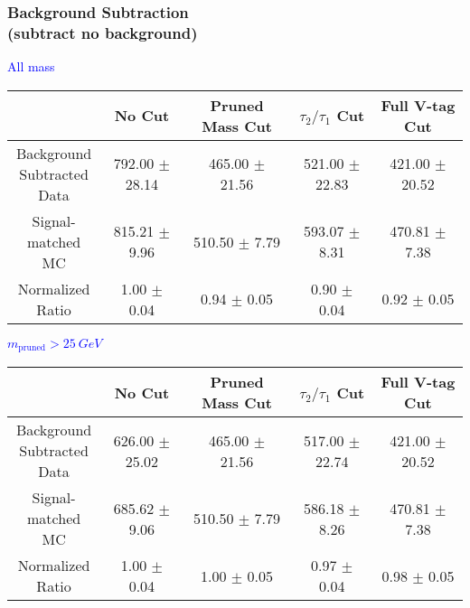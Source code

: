 \documentclass{beamer}
\begin{document}
\begin{frame}
  \frametitle{Background Subtraction \\ (subtract no background)}
  \begin{adjustwidth}{-1.5em}{-1.5em}
    \centering
    \vspace{6pt}
    \textcolor{blue}{All mass}
    \vspace{6pt}

    {\scriptsize
      \begin{tabular}{c | c | c | c | c}
        \hline
        & No Cut & Pruned Mass Cut & $\tau_2/\tau_1$ Cut & Full V-tag Cut \\
        \hline
        \makecell{Background \\ Subtracted \\ Data} & 792.00 $\pm$ 28.14 & 465.00 $\pm$ 21.56 & 521.00 $\pm$ 22.83 & 421.00 $\pm$ 20.52 \\
        \makecell{Signal-\\ matched MC} & 815.21 $\pm$ 9.96 & 510.50 $\pm$ 7.79 & 593.07 $\pm$ 8.31 & 470.81 $\pm$ 7.38 \\
        \hline
        \makecell{Normalized \\ Ratio} & 1.00 $\pm$ 0.04 & 0.94 $\pm$ 0.05 & 0.90 $\pm$ 0.04 & 0.92 $\pm$ 0.05 \\
        \hline
      \end{tabular}
    }

    \vspace{6pt}
    \textcolor{blue}{$m_\text{pruned} > \SI{25}{GeV}$}
    \vspace{6pt}

    {\scriptsize
      \begin{tabular}{c | c | c | c | c}
        \hline
        & No Cut & Pruned Mass Cut & $\tau_2/\tau_1$ Cut & Full V-tag Cut \\
        \hline
        \makecell{Background \\ Subtracted \\ Data} & 626.00 $\pm$ 25.02 & 465.00 $\pm$ 21.56 & 517.00 $\pm$ 22.74 & 421.00 $\pm$ 20.52 \\
        \makecell{Signal-\\ matched MC} & 685.62 $\pm$ 9.06 & 510.50 $\pm$ 7.79 & 586.18 $\pm$ 8.26 & 470.81 $\pm$ 7.38 \\
        \hline
        \makecell{Normalized \\ Ratio} & 1.00 $\pm$ 0.04 & 1.00 $\pm$ 0.05 & 0.97 $\pm$ 0.04 & 0.98 $\pm$ 0.05 \\
        \hline
      \end{tabular}
    }
  \end{adjustwidth}
\end{frame}
\end{document}
